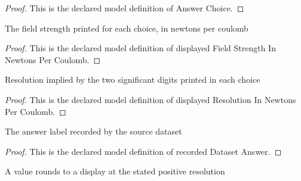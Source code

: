 \begin{proof}
  This is the declared model definition of Answer Choice.
\end{proof}
\begin{definition}
  \label{def:physics:phyx-mini-0915:phyxminiproblems-problemphyxmini0915-answerchoice-displayedfieldstrengthinnewtonspercoulomb}
  The field strength printed for each choice, in newtons per coulomb
\end{definition}
\begin{proof}
  This is the declared model definition of displayed Field Strength In Newtons Per Coulomb.
\end{proof}
\begin{definition}
  \label{def:physics:phyx-mini-0915:phyxminiproblems-problemphyxmini0915-answerchoice-displayedresolutioninnewtonspercoulomb}
  Resolution implied by the two significant digits printed in each choice
\end{definition}
\begin{proof}
  This is the declared model definition of displayed Resolution In Newtons Per Coulomb.
\end{proof}
\begin{definition}
  \label{def:physics:phyx-mini-0915:phyxminiproblems-problemphyxmini0915-recordeddatasetanswer}
  The answer label recorded by the source dataset
\end{definition}
\begin{proof}
  This is the declared model definition of recorded Dataset Answer.
\end{proof}
\begin{definition}
  \label{def:physics:phyx-mini-0915:phyxminiproblems-problemphyxmini0915-roundstonearestresolution}
  A value rounds to a display at the stated positive resolution
\end{definition}
